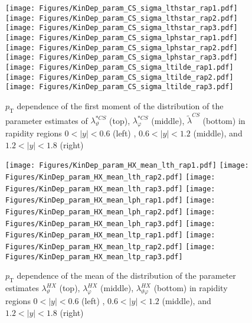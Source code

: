 \documentclass[12pt]{article}
\newcommand{\pT}{p_\mathrm{T}}
\newcommand{\absy}{\left |  y \right |}
\newcommand{\lamtildeCS}{\tilde{\lambda}^{\scriptscriptstyle CS}}
\newcommand{\lamthstarCS}{\lambda^{* \scriptscriptstyle CS}_\vartheta}
\newcommand{\lamphstarCS}{\lambda^{* \scriptscriptstyle CS}_\varphi}
\newcommand{\lamthHX}{\lambda^{\scriptscriptstyle HX}_\vartheta}
\newcommand{\lamphHX}{\lambda^{\scriptscriptstyle HX}_\varphi}
\newcommand{\lamthphHX}{\lambda^{\scriptscriptstyle HX}_{\vartheta \varphi}}
\begin{document}
\begin{figure}[htbp]
\centering
\texttt{[image: Figures/KinDep\_param\_CS\_sigma\_lthstar\_rap1.pdf]}
\texttt{[image: Figures/KinDep\_param\_CS\_sigma\_lthstar\_rap2.pdf]}
\texttt{[image: Figures/KinDep\_param\_CS\_sigma\_lthstar\_rap3.pdf]}
\texttt{[image: Figures/KinDep\_param\_CS\_sigma\_lphstar\_rap1.pdf]}
\texttt{[image: Figures/KinDep\_param\_CS\_sigma\_lphstar\_rap2.pdf]}
\texttt{[image: Figures/KinDep\_param\_CS\_sigma\_lphstar\_rap3.pdf]}
\texttt{[image: Figures/KinDep\_param\_CS\_sigma\_ltilde\_rap1.pdf]}
\texttt{[image: Figures/KinDep\_param\_CS\_sigma\_ltilde\_rap2.pdf]}
\texttt{[image: Figures/KinDep\_param\_CS\_sigma\_ltilde\_rap3.pdf]}
\caption{$\pT$ dependence of the first moment of the distribution of the parameter estimates of $\lamthstarCS$ (top), $\lamphstarCS$ (middle), $\lamtildeCS$ (bottom) in rapidity regions $0<\absy<0.6$ (left) , $0.6<\absy<1.2$ (middle), and $1.2<\absy<1.8$ (right)}
\end{figure}
\clearpage









\begin{figure}[htbp]
\centering
\texttt{[image: Figures/KinDep\_param\_HX\_mean\_lth\_rap1.pdf]}
\texttt{[image: Figures/KinDep\_param\_HX\_mean\_lth\_rap2.pdf]}
\texttt{[image: Figures/KinDep\_param\_HX\_mean\_lth\_rap3.pdf]}
\texttt{[image: Figures/KinDep\_param\_HX\_mean\_lph\_rap1.pdf]}
\texttt{[image: Figures/KinDep\_param\_HX\_mean\_lph\_rap2.pdf]}
\texttt{[image: Figures/KinDep\_param\_HX\_mean\_lph\_rap3.pdf]}
\texttt{[image: Figures/KinDep\_param\_HX\_mean\_ltp\_rap1.pdf]}
\texttt{[image: Figures/KinDep\_param\_HX\_mean\_ltp\_rap2.pdf]}
\texttt{[image: Figures/KinDep\_param\_HX\_mean\_ltp\_rap3.pdf]}
\caption{$\pT$ dependence of the mean of the distribution of the parameter estimates $\lamthHX$ (top), $\lamphHX$ (middle), $\lamthphHX$ (bottom) in rapidity regions $0<\absy<0.6$ (left) , $0.6<\absy<1.2$ (middle), and $1.2<\absy<1.8$ (right)}
\end{figure}
\clearpage
\end{document}

